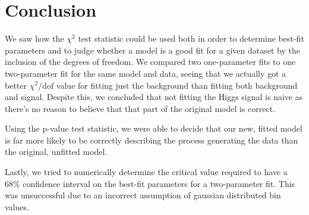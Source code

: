 \documentclass[11pt]{article}
\newcommand{\chisq}{\chi^2}
\newcommand{\chisqdof}{\chi^2/\mathrm{dof}}
\numberwithin{equation}{section}
\numberwithin{figure}{section}
\numberwithin{table}{section}
\begin{document}
\section{Conclusion}\label{sec:Conclusion}
We saw how the $\chisq$ test statistic could be used both in order to determine best-fit parameters and to judge whether a model is a good fit for a given dataset by the inclusion of the degrees of freedom. We compared two one-parameter fits to one two-parameter fit for the same model and data, seeing that we actually got a better $\chisqdof$ value for fitting just the background than fitting both background and signal. Despite this, we concluded that not fitting the Higgs signal is naive as there's no reason to believe that that part of the original model is correct. 

Using the p-value test statistic, we were able to decide that our new, fitted model is far more likely to be correctly describing the process generating the data than the original, unfitted model. 

Lastly, we tried to numerically determine the critical value required to have a $68\%$ confidence interval on the best-fit parameters for a two-parameter fit. This was unsuccessful due to an incorrect assumption of gaussian distributed bin values. 


\printbibliography

% 
\end{document}

